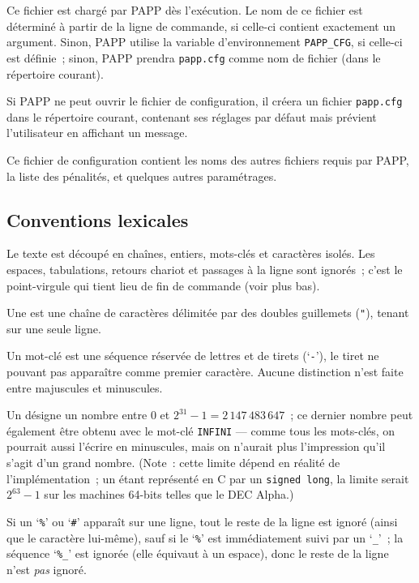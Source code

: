 \documentclass[10pt]{article}
\begin{document}
	Ce fichier est chargé par PAPP dès l'exécution.  Le nom
de ce fichier est déterminé à partir de la ligne de commande, si
celle-ci contient exactement un argument.  Sinon, PAPP utilise la
variable d'environnement \verb|PAPP_CFG|, si celle-ci est définie~;
sinon, PAPP prendra \verb|papp.cfg| comme nom de fichier (dans le
répertoire courant).

	Si PAPP ne peut ouvrir le fichier de configuration, il
créera un fichier \verb|papp.cfg| dans le répertoire courant,
contenant ses réglages par défaut mais prévient l'utilisateur
en affichant un message.
 
	Ce fichier de configuration contient les noms des autres
fichiers requis par PAPP, la liste des pénalités, et quelques
autres paramétrages.
 
\subsection{Conventions lexicales}

	Le texte est découpé en chaînes, entiers, mots-clés
et caractères isolés.  Les espaces, tabulations, retours chariot
et passages à la ligne sont ignorés~; c'est le point-virgule qui
tient lieu de fin de commande (voir plus bas).

	Une  est une chaîne de caractères
délimitée par des doubles guillemets (\verb|"|), tenant sur une
seule ligne.

	Un mot-clé est une séquence réservée de lettres et de
tirets (`\verb|-|'), le tiret ne pouvant pas apparaître comme
premier caractère.  Aucune distinction n'est faite entre majuscules
et minuscules.

	Un  désigne un nombre entre $0$ et $2^{31}-1 =
2\,147\,483\,647$~; ce dernier nombre peut également être obtenu
avec le mot-clé \verb|INFINI| --- comme tous les mots-clés, on
pourrait aussi l'écrire en minuscules, mais on n'aurait plus
l'impression qu'il s'agit d'un grand nombre.  (Note~: cette limite
dépend en réalité de l'implémentation~; un  étant
représenté en C par un \verb|signed long|, la limite serait
$2^{63}-1$ sur les machines 64-bits telles que le DEC Alpha.)

	Si un `\verb|%|' ou `\verb|#|' apparaît sur une ligne, tout
le reste de la ligne est ignoré (ainsi que le caractère lui-même),
sauf si le `\verb|%|' est immédiatement suivi par un `\verb|_|'~; la
séquence `\verb|%_|' est ignorée (elle équivaut à un espace),
donc le reste de la ligne n'est {\em pas\/} ignoré.
\end{document}
